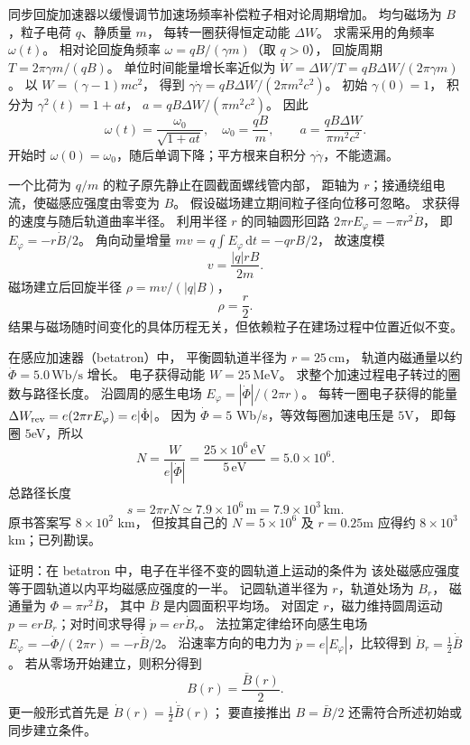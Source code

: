 同步回旋加速器以缓慢调节加速场频率补偿粒子相对论周期增加。
均匀磁场为 $B$，粒子电荷 $q$、静质量 $m$，
每转一圈获得恒定动能 $\Delta W$。
求需采用的角频率 $\omega(t)$。
\exsolution
相对论回旋角频率
$\omega=qB/(\gamma m)$（取 $q>0$），
回旋周期
$T=2\pi\gamma m/(qB)$。
单位时间能量增长率近似为
$\dot W=\Delta W/T=qB\Delta W/(2\pi\gamma m)$。
以 $W=(\gamma-1)mc^2$，
得到
$\gamma\dot\gamma=qB\Delta W/(2\pi m^2c^2)$。
初始 $\gamma(0)=1$，
积分为
$\gamma^2(t)=1+at$，
$a=qB\Delta W/(\pi m^2c^2)$。
因此
\[
\boxed{\omega(t)=\frac{\omega_0}{\sqrt{1+at}}},
\quad
\boxed{\omega_0=\frac{qB}{m},\qquad
a=\frac{qB\Delta W}{\pi m^2c^2}}.
\]
\excheck 开始时 $\omega(0)=\omega_0$，随后单调下降；平方根来自积分 $\gamma\dot\gamma$，不能遗漏。

一个比荷为 $q/m$ 的粒子原先静止在圆截面螺线管内部，
距轴为 $r$；接通绕组电流，使磁感应强度由零变为 $B$。
假设磁场建立期间粒子径向位移可忽略。
求获得的速度与随后轨道曲率半径。
\exsolution
利用半径 $r$ 的同轴圆形回路
$2\pi rE_\varphi=-\pi r^2\dot B$，
即 $E_\varphi=-r\dot B/2$。
角向动量增量
$mv=q\int E_\varphi\,\mathrm dt
=-qrB/2$，
故速度模
\[
\boxed{v=\frac{|q|rB}{2m}}.
\]
磁场建立后回旋半径
$\rho=mv/(|q|B)$，
\[
\boxed{\rho=\frac r2}.
\]
\excheck 结果与磁场随时间变化的具体历程无关，但依赖粒子在建场过程中位置近似不变。

在感应加速器（betatron）中，
平衡圆轨道半径为 $r=25\,\mathrm{cm}$，
轨道内磁通量以约
$\dot\Phi=5.0\,\mathrm{Wb/s}$ 增长。
电子获得动能 $W=25\,\mathrm{MeV}$。
求整个加速过程电子转过的圈数与路径长度。
\exsolution
沿圆周的感生电场
$E_\varphi=|\dot\Phi|/(2\pi r)$。
每转一圈电子获得的能量
$\Delta W_{\rm rev}=e(2\pi rE_\varphi)=e|\dot\Phi|$。
因为 $\dot\Phi=5$ Wb/s，等效每圈加速电压是 $5$V，
即每圈 $5$eV，所以
\[
\boxed{N=\frac{W}{e|\dot\Phi|}
=\frac{25\times10^6\,\mathrm{eV}}{5\,\mathrm{eV}}
=5.0\times10^6}.
\]
总路径长度
\[
\boxed{s=2\pi rN
\simeq7.9\times10^6\,\mathrm m
=7.9\times10^3\,\mathrm{km}}.
\]
\excheck 原书答案写 $8\times10^2$ km，
但按其自己的 $N=5\times10^6$ 及 $r=0.25$m
应得约 $8\times10^3$ km；已列勘误。

证明：在 betatron 中，电子在半径不变的圆轨道上运动的条件为
该处磁感应强度等于圆轨道以内平均磁感应强度的一半。
\exsolution
记圆轨道半径为 $r$，轨道处场为 $B_r$，
磁通量为 $\Phi=\pi r^2\bar B$，
其中 $\bar B$ 是内圆面积平均场。
对固定 $r$，磁力维持圆周运动
$p=erB_r$；对时间求导得
$\dot p=er\dot B_r$。
法拉第定律给环向感生电场
$E_\varphi=-\dot\Phi/(2\pi r)
=-r\dot{\bar B}/2$。
沿速率方向的电力为
$\dot p=e|E_\varphi|$，比较得到
$\dot B_r=\tfrac12\dot{\bar B}$。
若从零场开始建立，则积分得到
\[
\boxed{B(r)=\frac{\bar B(r)}2}.
\]
\excheck 更一般形式首先是
$\dot B(r)=\tfrac12\dot{\bar B}(r)$；
要直接推出 $B=\bar B/2$ 还需符合所述初始或同步建立条件。

